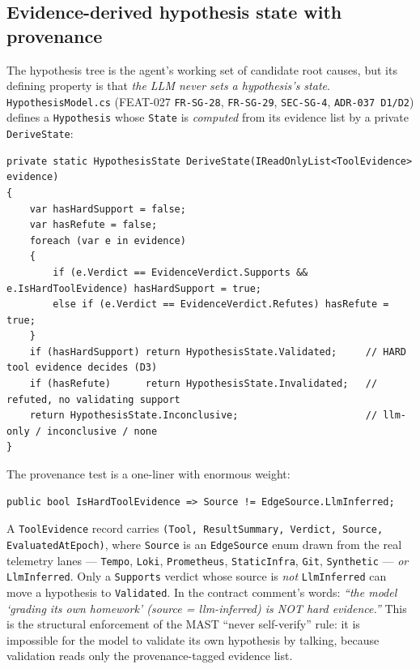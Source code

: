 \documentclass[11pt]{article}
\begin{document}
\subsection{Evidence-derived hypothesis state with provenance}

The hypothesis tree is the agent's working set of candidate root causes, but
its defining property is that \emph{the LLM never sets a hypothesis's state}.
\texttt{HypothesisModel.cs} (FEAT-027 \texttt{FR-SG-28}, \texttt{FR-SG-29},
\texttt{SEC-SG-4}, \texttt{ADR-037 D1/D2}) defines a \texttt{Hypothesis} whose
\texttt{State} is \emph{computed} from its evidence list by a private
\texttt{DeriveState}:

\begin{verbatim}
private static HypothesisState DeriveState(IReadOnlyList<ToolEvidence> evidence)
{
    var hasHardSupport = false;
    var hasRefute = false;
    foreach (var e in evidence)
    {
        if (e.Verdict == EvidenceVerdict.Supports && e.IsHardToolEvidence) hasHardSupport = true;
        else if (e.Verdict == EvidenceVerdict.Refutes) hasRefute = true;
    }
    if (hasHardSupport) return HypothesisState.Validated;     // HARD tool evidence decides (D3)
    if (hasRefute)      return HypothesisState.Invalidated;   // refuted, no validating support
    return HypothesisState.Inconclusive;                      // llm-only / inconclusive / none
}
\end{verbatim}

The provenance test is a one-liner with enormous weight:

\begin{verbatim}
public bool IsHardToolEvidence => Source != EdgeSource.LlmInferred;
\end{verbatim}

A \texttt{ToolEvidence} record carries \texttt{(Tool, ResultSummary, Verdict,
Source, EvaluatedAtEpoch)}, where \texttt{Source} is an \texttt{EdgeSource}
enum drawn from the real telemetry lanes --- \texttt{Tempo}, \texttt{Loki},
\texttt{Prometheus}, \texttt{StaticInfra}, \texttt{Git}, \texttt{Synthetic}
--- \emph{or} \texttt{LlmInferred}. Only a \texttt{Supports} verdict whose
source is \emph{not} \texttt{LlmInferred} can move a hypothesis to
\texttt{Validated}. In the contract comment's words: \emph{``the model
`grading its own homework' (source = llm-inferred) is NOT hard evidence.''}
This is the structural enforcement of the MAST ``never self-verify'' rule: it
is impossible for the model to validate its own hypothesis by talking, because
validation reads only the provenance-tagged evidence list.
\end{document}
